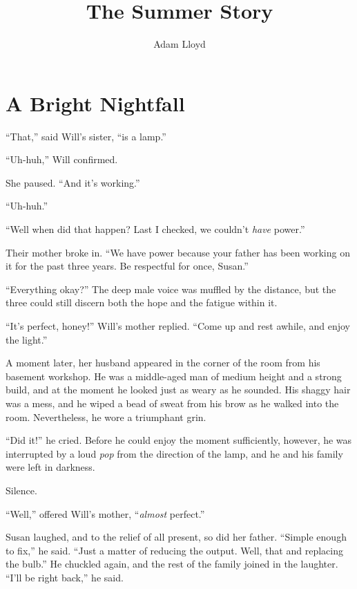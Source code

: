 \documentclass[12pt,letterpaper,oneside,english]{book}
\begin{document}
\title{The Summer Story}


\author{Adam Lloyd}

\maketitle
\tableofcontents{}


\chapter{A Bright Nightfall}

``That,'' said Will's sister, ``is a lamp.''

``Uh-huh,'' Will confirmed.

She paused. ``And it's working.''

``Uh-huh.''

``Well when did that happen? Last I checked, we couldn't \emph{have}
power.''

Their mother broke in. ``We have power because your father has
been working on it for the past three years. Be respectful for once,
Susan.''

``Everything okay?'' The deep male voice was muffled by the distance,
but the three could still discern both the hope and the fatigue within
it.

``It's perfect, honey!'' Will's mother replied. ``Come up and
rest awhile, and enjoy the light.''

A moment later, her husband appeared in the corner of the room from
his basement workshop. He was a middle-aged man of medium height and
a strong build, and at the moment he looked just as weary as he sounded.
His shaggy hair was a mess, and he wiped a bead of sweat from his
brow as he walked into the room. Nevertheless, he wore a triumphant
grin.

``Did it!'' he cried. Before he could enjoy the moment sufficiently,
however, he was interrupted by a loud \emph{pop} from the direction
of the lamp, and he and his family were left in darkness.

Silence.

``Well,'' offered Will's mother, ``\emph{almost} perfect.''

Susan laughed, and to the relief of all present, so did her father.
``Simple enough to fix,'' he said. ``Just a matter of reducing the
output. Well, that and replacing the bulb.'' He chuckled again, and the
rest of the family joined in the laughter. ``I'll be right back,'' he
said.
\end{document}
